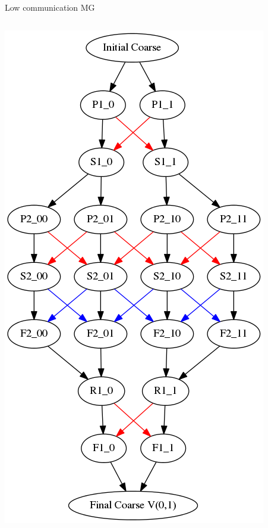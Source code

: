 \begin{frame}{Low communication MG}
\begin{columns}
\begin{column}{0.45\textwidth}
      \includegraphics[width=\textwidth]{figures/MG/LowCommunication}
    \end{column}
  \end{columns}
\end{frame}
